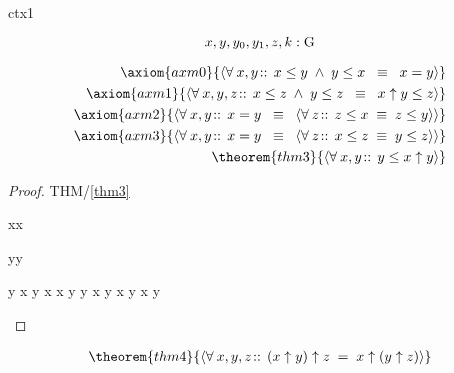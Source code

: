 \documentclass[12pt]{amsart}
\begin{document}
\begin{context}{ctx1}

\newset{\G}

\[ x,y,y_0,y_1,z,k: \text{G} \]

\precedence{[[\uparrow],[\le]]}
\begin{align}
\axiom{axm0}{ 
	\qforall{x,y}{}{ x \le y \1\land y \le x \2\equiv x = y } } 
\\ \axiom{axm1}{ 
	\qforall{x,y,z}{}{ x \le z \1\land y \le z \2\equiv 
		x \uparrow y \le z } }
\\ \axiom{axm2}{ 
	\qforall{x,y}{}{ x = y \2\equiv \qforall{z}{}{ z \le x \1\equiv z \le y } } }
\\ \axiom{axm3}{ 
	\qforall{x,y}{}{ x = y \2\equiv \qforall{z}{}{ x \le z \1\equiv y \le z } } }
\\ \theorem{thm3}{ \qforall{x,y}{}{ y \le x \uparrow y } }
\end{align}

\begin{proof}{THM/\ref{thm3}}
	\begin{free:var}{x}{x}
	\begin{free:var}{y}{y}
\begin{calculation}
		y \le x \uparrow y
		x \le x \uparrow y
	\2\land	y \le x \uparrow y
	\hint{=}{ \eqref{axm1} }
		x \uparrow y \1\le x \uparrow y
	\hint{=}{ \eqref{axm0} }
		\true
\end{calculation}
	\end{free:var}
	\end{free:var}
\end{proof}

\begin{align}
\theorem{thm4}{ \qforall{x,y,z}{}{ (x \uparrow y) \uparrow z \1= x \uparrow (y \uparrow z) } }
\end{align}


\end{context}
\end{document}
